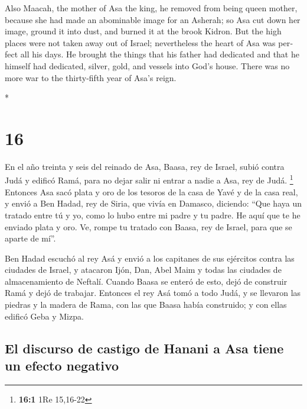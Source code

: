\begin{paracol}{2}
\begin{otherlanguage}{english}
 Also Maacah, the mother of Asa the king, he removed from
being queen mother, because she had made an abominable image for an
Asherah; so Asa cut down her image, ground it into dust, and burned it
at the brook Kidron.  But the high places were not taken
away out of Israel; nevertheless the heart of Asa was perfect all his
days.  He brought the things that his father had
dedicated and that he himself had dedicated, silver, gold, and vessels
into God's house.  There was no more war to the
thirty-fifth year of Asa's reign.

\end{otherlanguage}

\switchcolumn[0]*

\hypertarget{section-30}{%
\section{16}\label{section-30}}

 En el año treinta y seis del reinado de Asa, Baasa, rey
de Israel, subió contra Judá y edificó Ramá, para no dejar salir ni
entrar a nadie a Asa, rey de Judá. \footnote{\textbf{16:1} 1Re 15,16-22}
 Entonces Asa sacó plata y oro de los tesoros de la casa
de Yavé y de la casa real, y envió a Ben Hadad, rey de Siria, que vivía
en Damasco, diciendo:  ``Que haya un tratado entre tú y
yo, como lo hubo entre mi padre y tu padre. He aquí que te he enviado
plata y oro. Ve, rompe tu tratado con Baasa, rey de Israel, para que se
aparte de mí''.

 Ben Hadad escuchó al rey Asá y envió a los capitanes de
sus ejércitos contra las ciudades de Israel, y atacaron Ijón, Dan, Abel
Maim y todas las ciudades de almacenamiento de Neftalí. 
Cuando Baasa se enteró de esto, dejó de construir Ramá y dejó de
trabajar.  Entonces el rey Asá tomó a todo Judá, y se
llevaron las piedras y la madera de Rama, con las que Baasa había
construido; y con ellas edificó Geba y Mizpa.

\hypertarget{el-discurso-de-castigo-de-hanani-a-asa-tiene-un-efecto-negativo}{%
\subsection{El discurso de castigo de Hanani a Asa tiene un efecto
negativo}\label{el-discurso-de-castigo-de-hanani-a-asa-tiene-un-efecto-negativo}}


\end{paracol}
